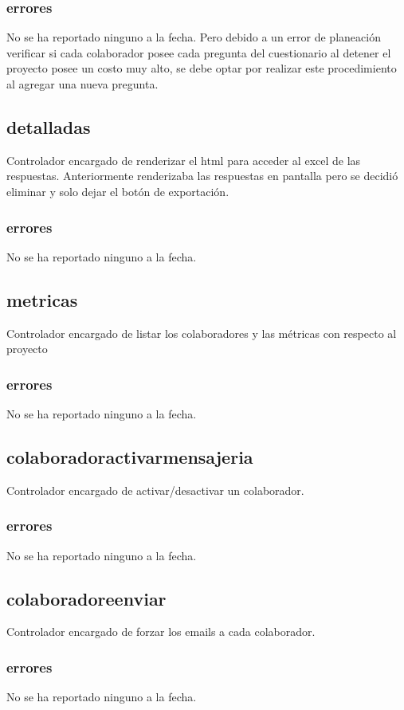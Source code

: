\documentclass[10pt,a4paper]{book}
\begin{document}
	\subsubsection{errores}
	No se ha reportado ninguno a la fecha. Pero debido a un error de planeación verificar si cada colaborador posee cada pregunta del cuestionario al detener el proyecto posee un costo muy alto, se debe optar por realizar este procedimiento al agregar una nueva pregunta.
	
	\subsection{detalladas}
	Controlador encargado de renderizar el html para acceder al excel de las respuestas. Anteriormente renderizaba las respuestas en pantalla pero se decidió eliminar y solo dejar el botón  de exportación.
	\subsubsection{errores}
	No se ha reportado ninguno a la fecha.
	
	\subsection{metricas}
	Controlador encargado de listar los colaboradores y las métricas con respecto al proyecto
	\subsubsection{errores}
	No se ha reportado ninguno a la fecha.
	
	\subsection{colaboradoractivarmensajeria}
	Controlador encargado de activar/desactivar un colaborador.
	\subsubsection{errores}
	No se ha reportado ninguno a la fecha.
	
	\subsection{colaboradoreenviar}
	Controlador encargado de forzar los emails a cada colaborador.
	\subsubsection{errores}
	No se ha reportado ninguno a la fecha.
	
\end{document}
